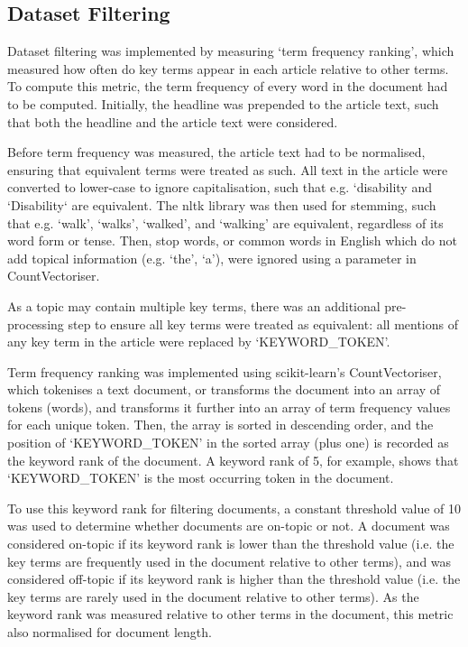\documentclass{report}
\begin{document}
\subsection{Dataset Filtering} \label{des-filtering}

Dataset filtering was implemented by measuring `term frequency ranking', which measured how often do key terms appear in each article relative to other terms.
To compute this metric, the term frequency of every word in the document had to be computed.
Initially, the headline was prepended to the article text, such that both the headline and the article text were considered.

Before term frequency was measured, the article text had to be normalised, ensuring that equivalent terms were treated as such.
All text in the article were converted to lower-case to ignore capitalisation, such that e.g. `disability and `Disability` are equivalent.
The nltk library \cite{Nltk} was then used for stemming, such that e.g. `walk', `walks', `walked', and `walking' are equivalent, regardless of its word form or tense.
Then, stop words, or common words in English which do not add topical information (e.g. `the', `a'), were ignored using a parameter in CountVectoriser.

As a topic may contain multiple key terms, there was an additional pre-processing step to ensure all key terms were treated as equivalent: all mentions of any key term in the article were replaced by `KEYWORD\_TOKEN'.

Term frequency ranking was implemented using scikit-learn's \cite{Scikit-learn} CountVectoriser, which tokenises a text document, or transforms the document into an array of tokens (words), and transforms it further into an array of term frequency values for each unique token.
Then, the array is sorted in descending order, and the position of `KEYWORD\_TOKEN' in the sorted array (plus one) is recorded as the keyword rank of the document.
A keyword rank of 5, for example, shows that `KEYWORD\_TOKEN' is the  most occurring token in the document.

To use this keyword rank for filtering documents, a constant threshold value of 10 was used to determine whether documents are on-topic or not.
A document was considered on-topic if its keyword rank is lower than the threshold value (i.e. the key terms are frequently used in the document relative to other terms), and was considered off-topic if its keyword rank is higher than the threshold value (i.e. the key terms are rarely used in the document relative to other terms).
As the keyword rank was measured relative to other terms in the document, this metric also normalised for document length.
\end{document}
